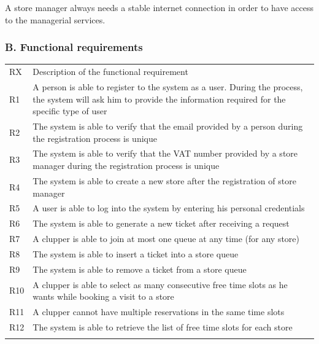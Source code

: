 A store manager always needs a stable internet connection in order to
have access to the managerial services.

\hypertarget{b.-functional-requirements}{%
\subsubsection{B. Functional
requirements}\label{b.-functional-requirements}}

\begin{longtable}[]{@{}
  >{\raggedright\arraybackslash}p{}
  >{\raggedright\arraybackslash}p{}@{}}
\toprule
RX & Description of the functional requirement \\ \addlinespace
\midrule
\endhead
R1 & A person is able to register to the system as a user. During the
process, the system will ask him to provide the information required for
the specific type of user \\ \addlinespace
R2 & The system is able to verify that the email provided by a person
during the registration process is unique \\ \addlinespace
R3 & The system is able to verify that the VAT number provided by a
store manager during the registration process is unique \\ \addlinespace
R4 & The system is able to create a new store after the registration of
store manager \\ \addlinespace
R5 & A user is able to log into the system by entering his personal
credentials \\ \addlinespace
R6 & The system is able to generate a new ticket after receiving a
request \\ \addlinespace
R7 & A clupper is able to join at most one queue at any time (for any
store) \\ \addlinespace
R8 & The system is able to insert a ticket into a store
queue \\ \addlinespace
R9 & The system is able to remove a ticket from a store
queue \\ \addlinespace
R10 & A clupper is able to select as many consecutive free time slots as
he wants while booking a visit to a store \\ \addlinespace
R11 & A clupper cannot have multiple reservations in the same time
slots \\ \addlinespace
R12 & The system is able to retrieve the list of free time slots for
each store \\ \addlinespace

\end{longtable}
